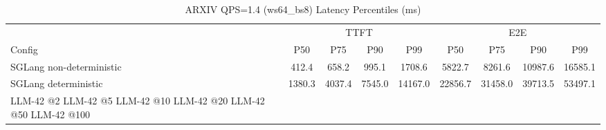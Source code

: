 \begin{table}[htbp]
\centering
\caption{ARXIV QPS=1.4 (ws64_bs8) Latency Percentiles (ms)}
\label{tab:arxiv_qps1.4_ws64_bs8}
\begin{tabular}{l|cccc|cccc}
\toprule
& \multicolumn{4}{c|}{TTFT} & \multicolumn{4}{c}{E2E} \\
Config & P50 & P75 & P90 & P99 & P50 & P75 & P90 & P99 \\
\midrule
SGLang non-deterministic & 412.4 & 658.2 & 995.1 & 1708.6 & 5822.7 & 8261.6 & 10987.6 & 16585.1 \\
SGLang deterministic & 1380.3 & 4037.4 & 7545.0 & 14167.0 & 22856.7 & 31458.0 & 39713.5 & 53497.1 \\
LLM-42 @2%
LLM-42 @5%
LLM-42 @10%
LLM-42 @20%
LLM-42 @50%
LLM-42 @100%
\bottomrule
\end{tabular}
\end{table}
